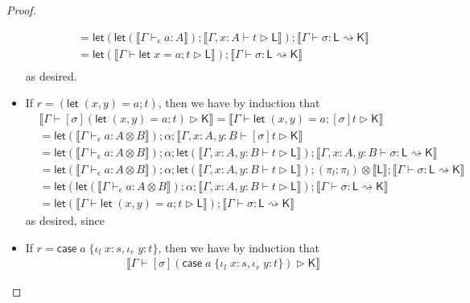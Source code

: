 \documentclass[acmsmall,screen,review]{acmart}
\newcommand{\ms}[1]{\ensuremath{\mathsf{#1}}}
\newcommand{\lto}{:}
\newcommand{\linl}[1]{\iota_l\;{#1}}
\newcommand{\linr}[1]{\iota_r\;{#1}}
\newcommand{\letstmt}[3]{\ensuremath{\ms{let}\;#1 = #2; #3}}
\newcommand{\casestmt}[5]{\ms{case}\;#1\;\{\linl{#2} \lto #3, \linr{#4} \lto #5\}}
\newcommand{\bhyp}[2]{#1 : #2}
\newcommand{\hasty}[4]{#1 \vdash_{#2} #3: {#4}}
\newcommand{\haslb}[3]{#1 \vdash #2 \rhd #3}
\newcommand{\lbsubst}[4]{#1 \vdash #2: #3 \rightsquigarrow #4}
\newcommand{\dnt}[1]{\llbracket{#1}\rrbracket}
\newcommand{\lmor}[1]{\ms{let}(#1)}
\begin{document}
\begin{proof}
\begin{itemize}[leftmargin=*]
\begin{equation}
\begin{aligned}
        & = \lmor{
            \lmor{\dnt{\hasty{\Gamma}{\epsilon}{a}{A}}}
            ; \dnt{\haslb{\Gamma, \bhyp{x}{A}}{t}{\ms{L}}}
          }
          ; \dnt{\lbsubst{\Gamma}{\sigma}{\ms{L}}{\ms{K}}} \\
        & = \lmor{\dnt{\haslb{\Gamma}{\letstmt{x}{a}{t}}{\ms{L}}}}
          ; \dnt{\lbsubst{\Gamma}{\sigma}{\ms{L}}{\ms{K}}} \\
      \end{aligned}
    \end{equation}
    as desired.
    \item If $r = (\letstmt{(x, y)}{a}{t})$, then we have by induction that
    \begin{equation}
      \begin{aligned}
        & \dnt{\haslb{\Gamma}{[\sigma](\letstmt{(x, y)}{a}{t})}{\ms{K}}} 
          = \dnt{\haslb{\Gamma}{\letstmt{(x, y)}{a}{[\sigma]t}}{\ms{K}}} \\
        & = \lmor{\dnt{\hasty{\Gamma}{\epsilon}{a}{A \otimes B}}} ; \alpha
          ; \dnt{\haslb{\Gamma, \bhyp{x}{A}, \bhyp{y}{B}}{[\sigma]t}{\ms{K}}} \\
        & = \lmor{\dnt{\hasty{\Gamma}{\epsilon}{a}{A \otimes B}}} ; \alpha
          ; \lmor{\dnt{\haslb{\Gamma, \bhyp{x}{A}, \bhyp{y}{B}}{t}{\ms{L}}}}
          ; \dnt{\lbsubst{\Gamma, \bhyp{x}{A}, \bhyp{y}{B}}{\sigma}{\ms{L}}{\ms{K}}} \\
          & = \lmor{\dnt{\hasty{\Gamma}{\epsilon}{a}{A \otimes B}}} ; \alpha
            ; \lmor{\dnt{\haslb{\Gamma, \bhyp{x}{A}, \bhyp{y}{B}}{t}{\ms{L}}}}
            ; (\pi_l ; \pi_l) \otimes \dnt{\ms{L}}
            ; \dnt{\lbsubst{\Gamma}{\sigma}{\ms{L}}{\ms{K}}} \\
        & = \lmor{\lmor{\dnt{\hasty{\Gamma}{\epsilon}{a}{A \otimes B}}} ; \alpha 
            ; \dnt{\haslb{\Gamma, \bhyp{x}{A}, \bhyp{y}{B}}{t}{\ms{L}}}}
          ; \dnt{\lbsubst{\Gamma}{\sigma}{\ms{L}}{\ms{K}}} \\
        & = \lmor{\dnt{\haslb{\Gamma}{\letstmt{(x, y)}{a}{t}}{\ms{L}}}}
          ; \dnt{\lbsubst{\Gamma}{\sigma}{\ms{L}}{\ms{K}}}
      \end{aligned}
    \end{equation}
    as desired, since 
    \item If $r = \casestmt{a}{x}{s}{y}{t}$, then we have by induction that
    \begin{equation}
      \begin{aligned}
        & \dnt{\haslb{\Gamma}{[\sigma](\casestmt{a}{x}{s}{y}{t})}{\ms{K}}} 

\end{aligned}
\end{equation}
\end{itemize}
\end{proof}
\end{document}
